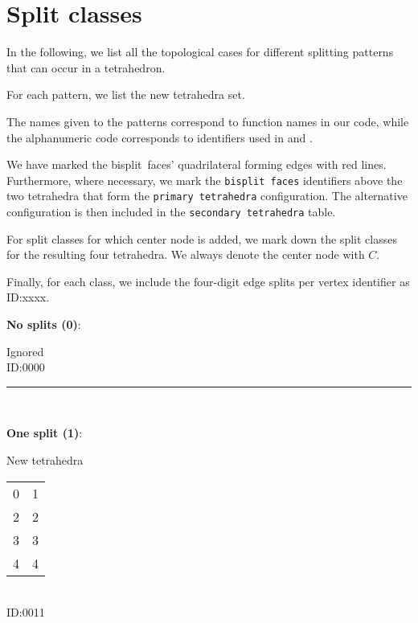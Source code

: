 \documentclass{article}
\begin{document}
	\pagebreak
	\section{Split classes}
	\label{sec:classes}
	In the following, we list all the topological cases for different splitting patterns that can occur in a tetrahedron.

	For each pattern, we list the new tetrahedra set.

	The names given to the patterns correspond to function names in our code, while the alphanumeric code corresponds to identifiers used in \cite{embarrassinglyparallel} and \cite{edgebased}.

	We have marked the bisplit~faces' quadrilateral forming edges with red lines. Furthermore, where necessary, we mark the \texttt{bisplit~faces} identifiers above the two tetrahedra that form the \texttt{primary~tetrahedra} configuration. The alternative configuration is then included in the \texttt{secondary~tetrahedra} table.

	For split classes for which center node is added, we mark down the split classes for the resulting four tetrahedra. We always denote the center node with  $C$.

	Finally, for each class, we include the four-digit edge splits per vertex identifier as ID:xxxx.

	\vspace{1cm}

	\begin{minipage}{0.5\textwidth}
		\textbf{No splits (0)}:

		\begin{center}
			
		\end{center}
	\end{minipage}
	\begin{minipage}{0.5\textwidth}
		Ignored
		\\

		ID:0000
	\end{minipage}

	\rule{\textwidth}{0.5pt}
	\\

	\begin{minipage}{0.5\textwidth}
		\textbf{One split (1)}:

		\begin{center}
			
		\end{center}
	\end{minipage}
	\begin{minipage}{0.5\textwidth}
		New tetrahedra

		\begin{tabular}{cc}
			\hline
			0 & 1 \\
			2 & 2 \\
			3 & 3 \\
			4 & 4
		\end{tabular}
		\\

		ID:0011
	\end{minipage}
\end{document}

